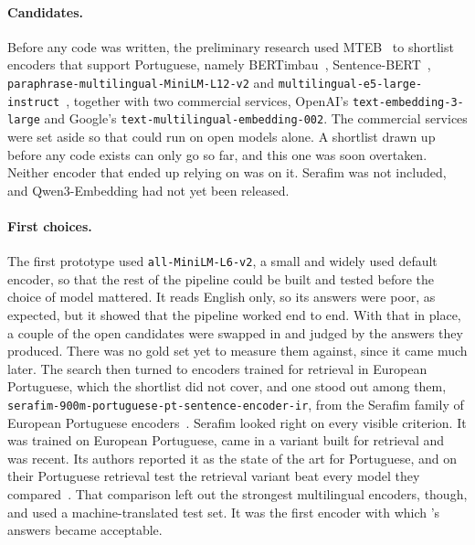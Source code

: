 \paragraph{Candidates.} Before any code was written, the preliminary research
used MTEB~\citep{mtebmassivetextembedding} to shortlist encoders that support
Portuguese, namely BERTimbau~\citep{souza2020bertimbau},
Sentence-BERT~\citep{reimers2019sentencebert},
\texttt{paraphrase-multilingual-MiniLM-L12-v2} and
\texttt{multilingual-e5-large-instruct}~\citep{wang2024multilinguale5textembeddings},
together with two commercial services, OpenAI's \texttt{text-embedding-3-large}
and Google's \texttt{text-multilingual-embedding-002}. The commercial services
were set aside so that \sysname{} could run on open models alone. A shortlist
drawn up before any code exists can only go so far, and this one was soon
overtaken. Neither encoder that \sysname{} ended up relying on was on it.
Serafim was not included, and Qwen3-Embedding had not yet been released.

\paragraph{First choices.} The first prototype used \texttt{all-MiniLM-L6-v2},
a small and widely used default encoder, so that the rest of the pipeline
could be built and tested before the choice of model mattered. It reads
English only, so its answers were poor, as expected, but it showed that the
pipeline worked end to end. With that in place, a couple of the open
candidates were swapped in and judged by the answers they produced. There was
no gold set yet to measure them against, since it came much later. The search
then turned to encoders trained for retrieval in European Portuguese, which
the shortlist did not cover, and one stood out among them,
\texttt{serafim-900m-portuguese-pt-sentence-encoder-ir}, from the Serafim
family of European Portuguese encoders~\citep{gomes2024serafim}. Serafim
looked right on every visible criterion. It was trained on European
Portuguese, came in a variant built for retrieval and was recent. Its authors
reported it as the state of the art for Portuguese, and on their Portuguese
retrieval test the retrieval variant beat every model they
compared~\citep{gomes2024serafim}. That comparison left out the strongest
multilingual encoders, though, and used a machine-translated test set.
It was the first encoder with which
\sysname{}'s answers became acceptable.


